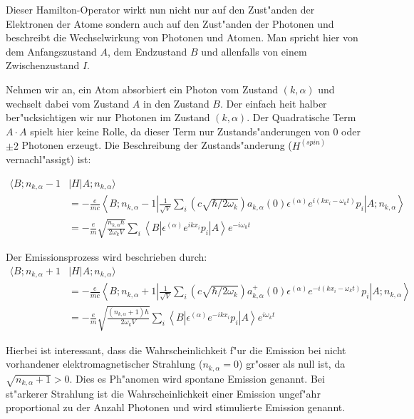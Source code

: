 Dieser Hamilton-Operator wirkt nun nicht nur auf den Zust"anden der Elektronen der Atome sondern auch auf den Zust"anden der Photonen und beschreibt die Wechselwirkung von Photonen und Atomen. Man spricht hier von dem Anfangszustand $A$, dem Endzustand $B$ und allenfalls von einem Zwischenzustand $I$.

Nehmen wir an, ein Atom absorbiert ein Photon vom Zustand $(k,\alpha)$ und wechselt dabei vom Zustand $A$ in den Zustand $B$. Der einfach heit halber ber"ucksichtigen wir nur Photonen im Zustand $(k,\alpha)$. Der Quadratische Term $A \cdot A$ spielt hier keine Rolle, da dieser Term nur Zustands"anderungen von $0$ oder $\pm 2$ Photonen erzeugt. Die Beschreibung der Zustands"anderung ($H^{(spin)}$ vernachl"assigt) ist:

\begin{equation}
\begin{split}
\langle B; n_{k,\alpha} - 1 &| H | A; n_{k,\alpha} \rangle \\
&= -\frac{e}{mc} \left\langle B; n_{k,\alpha} - 1 \left| 
\frac{1}{\sqrt{V}} \sum_i \left(c \sqrt{\hbar/2 \omega_k}\right)a_{k,\alpha}(0) \epsilon^{(\alpha)} e^{i(kx_i-\omega_k t)} p_i 
\right| A; n_{k,\alpha} \right\rangle\\
&= -\frac{e}{m} \sqrt{\frac{n_{k,\alpha} \hbar}{2 \omega_k V}} \sum_i \left\langle B \left| 
\epsilon^{(\alpha)} e^{ikx_i} p_i 
\right| A \right\rangle e^{-i\omega_k t}
\end{split}
\end{equation}

Der Emissionsprozess wird beschrieben durch:
\begin{equation}
\begin{split}
\langle B; n_{k,\alpha} + 1 &| H | A; n_{k,\alpha} \rangle \\
&= -\frac{e}{mc} \left\langle B; n_{k,\alpha} + 1 \left| 
\frac{1}{\sqrt{V}} \sum_i \left(c \sqrt{\hbar/2 \omega_k}\right)a^+_{k,\alpha}(0) \epsilon^{(\alpha)} e^{-i(kx_i-\omega_k t)} p_i 
\right| A; n_{k,\alpha} \right\rangle\\
&= -\frac{e}{m} \sqrt{\frac{ (n_{k,\alpha}+1) \hbar}{2 \omega_k V}} \sum_i \left\langle B \left| 
\epsilon^{(\alpha)} e^{-ikx_i} p_i 
\right| A \right\rangle e^{i\omega_k t}
\end{split}
\end{equation}

Hierbei ist interessant, dass die Wahrscheinlichkeit f"ur die Emission bei nicht vorhandener elektromagnetischer Strahlung ($n_{k,\alpha} = 0$) gr"osser als null ist, da $\sqrt{n_{k,\alpha}+1} > 0$. Dies es Ph"anomen wird spontane Emission genannt. Bei st"arkerer Strahlung ist die Wahrscheinlichkeit einer Emission ungef"ahr proportional zu der Anzahl Photonen und wird stimulierte Emission genannt.